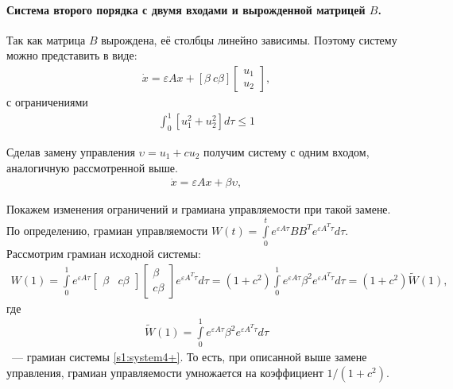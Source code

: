\documentclass[../main.tex]{subfiles}
\begin{document}
\paragraph{Система второго порядка с двумя входами и вырожденной матрицей $B$.}
Так как матрица $ B $ вырождена, её столбцы линейно зависимы.
Поэтому систему можно представить в виде:
\begin{gather}\label{s1:system4}
 \dot{x} = \varepsilon A x + \left[ \beta \ c\beta \right] {\left[ {\begin{array}{*{20}{c}}
 {{u_1}}\\
 {{u_2}}
 \end{array}} \right]}, 
\end{gather}
с ограничениями 
\begin{gather}\label{s1:contrainsts1}
 \int_{0}^{1} \left[ u_1^2 + u_2^2 \right] d \tau \leqslant 1
\end{gather}
 
Сделав замену управления $ \upsilon = u_1 + c u_2 $ получим систему с одним входом, аналогичную рассмотренной выше.
\begin{gather}\label{s1:system4+}
 \dot{x} = \varepsilon A x + \beta \upsilon, 
\end{gather}
 
Покажем изменения ограничений и грамиана управляемости при такой замене.
По определению, грамиан управляемости $ W(t) = \int \limits_0 ^ t e^{\varepsilon A\tau} B B^T e^{\varepsilon A^T\tau} d\tau $.
Рассмотрим грамиан исходной системы: 
\begin{gather*}
 W(1) = \int \limits_0 ^ 1 e^{\varepsilon A\tau} \left[ \begin{array}{cc}
 \beta & c \beta
 \end{array} \right] \left[ \begin{array}{c}
 \beta
 \\ c \beta 
 \end{array} \right] e^{\varepsilon A^T\tau} d\tau = (1 + c^2) \int \limits_0 ^ 1 e^{\varepsilon A\tau} \beta^2 e^{\varepsilon A^T\tau} d\tau = (1 + c^2) \tilde{W}(1),
\end{gather*}
где 
\begin{gather*}
 \tilde{W}(1) = \int \limits_0 ^ 1 e^{\varepsilon A\tau} \beta^2 e^{\varepsilon A^T\tau} d\tau 
\end{gather*}
~--- грамиан системы \eqref{s1:system4+}.
То есть, при описанной выше замене управления, грамиан управляемости умножается на коэффициент $ 1/(1 + c^2)$.
 
\end{document}
